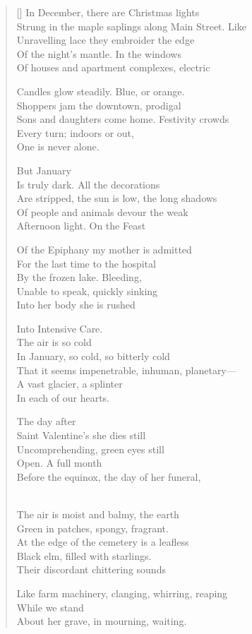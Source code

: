 \settowidth{\versewidth}{Strung in the maple saplings along Main Street. Like}
\begin{verse}[\versewidth]
In December, there are Christmas lights\\
Strung in the maple saplings along Main Street. Like\\
Unravelling lace they embroider the edge\\
Of the night’s mantle. In the windows\\
Of houses and apartment complexes, electric

Candles glow steadily. Blue, or orange.\\
Shoppers jam the downtown, prodigal \\
Sons and daughters come home.   Festivity crowds\\
Every turn; indoors or out,\\
One is never alone.

			But January \\
Is truly dark.   All the decorations\\
Are stripped, the sun is low, the long shadows\\
Of people and animals devour the weak\\
Afternoon light.   On the Feast

Of the Epiphany my mother is admitted\\
For the last time to the hospital\\
By the frozen lake.   Bleeding,\\
Unable to speak, quickly sinking\\
Into her body she is rushed

Into Intensive Care.\\
			The air is so cold\\
In January, so cold, so bitterly cold\\
That it seems impenetrable, inhuman, planetary—\\
A vast glacier, a splinter\\
In each of our hearts.

			The day after\\
Saint Valentine’s she dies still\\
Uncomprehending, green eyes still\\
Open.   A full month\\
Before the equinox, the day of her funeral,

\\
[new stanza]



The air is moist and balmy, the earth\\
Green in patches, spongy, fragrant.\\
At the edge of the cemetery is a leafless\\
Black elm, filled with starlings.\\
Their discordant chittering sounds

Like farm machinery, clanging, whirring, reaping\\
While we stand \\
About her grave, in mourning, waiting.
\end{verse}
